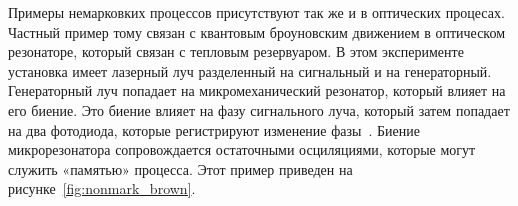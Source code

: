 Примеры немарковких процессов присутствуют так же и в оптических процесах.
Частный пример тому связан с квантовым броуновским движением в оптическом резонаторе, который связан
с тепловым резервуаром.
В этом эксперименте установка имеет лазерный луч разделенный на сигнальный и на генераторный.
Генераторный луч попадает на микромеханический резонатор, который влияет на его биение.
Это биение влияет на фазу сигнального луча, который затем попадает на два фотодиода, которые регистрируют
изменение фазы~\citep{nonmark2017dynamics}.
Биение микрорезонатора сопровождается остаточными осциляциями, которые могут служить «памятью» процесса.
Этот пример приведен на рисунке~\ref{fig:nonmark_brown}.
\begin{figure}[h!]
    \centering
    \captionsetup{justification=centering}
    \begin{minipage}[h]{0.4\linewidth}
    \end{minipage}
    \begin{minipage}[h]{0.5\linewidth}

\end{minipage}
\end{figure}
